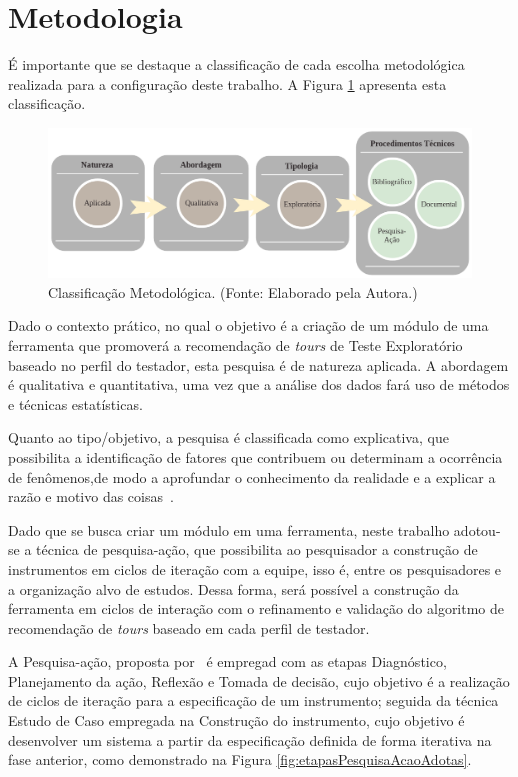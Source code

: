 \section{Metodologia}

É importante que se destaque a classificação de cada escolha metodológica realizada para a configuração deste trabalho. A Figura \ref{fig:classificacaoMetodologica}  apresenta esta classificação.

        \begin{figure}[h]
          \centering
          \includegraphics[width=14cm]{figuras/classificacaoMetodologica.png}
          \caption{Classificação Metodológica. (Fonte: Elaborado pela Autora.)} 
          \label{fig:classificacaoMetodologica}
        
        \end{figure}


Dado o contexto prático, no qual o objetivo é a criação de um módulo de uma ferramenta que promoverá a recomendação de \textit{tours} de Teste Exploratório baseado no perfil do testador, esta pesquisa é de natureza aplicada. A abordagem é qualitativa e quantitativa, uma vez que a análise dos dados fará uso de métodos e técnicas estatísticas.

Quanto ao tipo/objetivo, a pesquisa é classificada como explicativa, que possibilita a identificação de fatores que contribuem ou determinam a ocorrência de fenômenos,de modo a aprofundar o conhecimento da realidade e a explicar a razão e motivo das coisas~\cite{gil2002elaborar}. 

Dado que se busca criar um módulo em uma ferramenta, neste trabalho adotou-se a técnica de pesquisa-ação, que possibilita
ao pesquisador a construção de instrumentos em ciclos de iteração com a equipe, isso é, entre os pesquisadores e a organização alvo de estudos. Dessa forma, será possível a construção da ferramenta em ciclos de interação com o refinamento e validação do algoritmo de recomendação de \textit{tours} baseado em cada perfil de testador.

A Pesquisa-ação, proposta por~\cite{petersen2008systematic} é empregad com as etapas Diagnóstico, Planejamento da ação, Reflexão e Tomada de decisão, cujo objetivo é a realização de ciclos de iteração para a especificação de um instrumento; seguida da técnica Estudo de Caso empregada na Construção do instrumento, cujo objetivo é desenvolver um sistema a partir da especificação definida de forma iterativa na fase anterior, como demonstrado na Figura \ref{fig:etapasPesquisaAcaoAdotas}.

